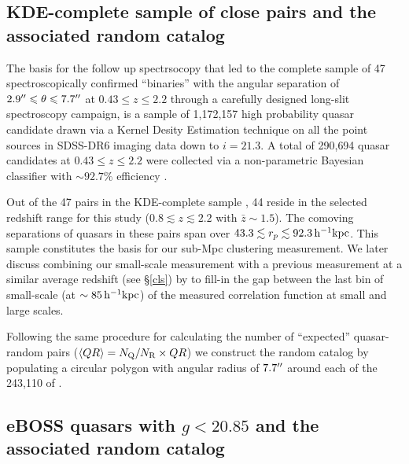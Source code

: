 \documentclass[useAMS,usenatbib]{mn2e}
\begin{document}
\subsection{KDE-complete sample of close pairs and the associated random catalog}\label{sdat}
The basis for the follow up spectrsocopy that led to the complete sample of 47 spectroscopically confirmed ``binaries'' with the angular separation of $2.9\arcsec \leq \theta \leq 7.7\arcsec$ at $0.43 \leq z \leq 2.2$ through a carefully designed long-slit spectroscopy campaign, is a sample of 1{,}172{,}157 high probability quasar candidate drawn via a Kernel Desity Estimation technique \citep[KDE;][]{ric04} on all the point sources in SDSS-DR6\citep[][]{admc08} imaging data down to $i=21.3$. A total of 290{,}694 quasar candidates at $0.43 \leq z \leq 2.2$ were collected via a non-parametric Bayesian classifier with $\sim 92.7\%$ efficiency \citep[see ][and references therein for detail]{ef17}. 

Out of the 47 pairs in the KDE-complete sample \citep[presented in Figure 4 and Table 5 of][]{ef17}, 44 reside in the selected redshift range for this study ($0.8 \lesssim z \lesssim 2.2$ with $\bar z\sim 1.5$). The comoving separations of quasars in these pairs span over $43.3 \lesssim r_p \lesssim 92.3 \, \rm h^{-1}kpc$. This sample constitutes the basis for our sub-Mpc clustering measurement. We later discuss combining our small-scale measurement with a previous measurement at a similar average redshift (see \S\ref{cls}) by \citet{ko12} to fill-in the gap between the last bin of small-scale (at $\sim 85 \, \rm h^{-1}kpc$) of the measured correlation function at small and large scales. 

Following the same procedure for calculating the number of ``expected'' quasar-random pairs ($\langle QR \rangle = N_{\rm Q}/N_{\rm R} \times QR$) we construct the random catalog by populating a circular polygon with angular radius of $7.7\arcsec$ around each of the 243{,}110 of \citep[see section 3.1 of][for a detailed description of the taken steps]{ef17}. 


\subsection{eBOSS quasars with $g<20.85$ and the associated random catalog}\label{ldat}
\end{document}
